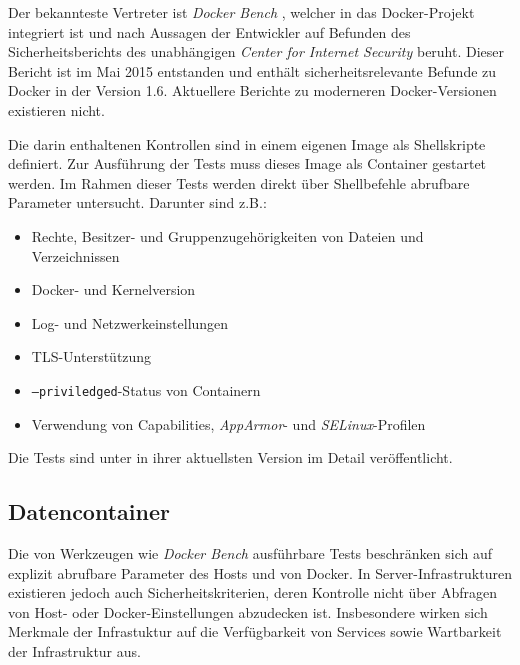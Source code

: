 \documentclass[../main.tex]{subfiles}
\begin{document}
    Der bekannteste Vertreter ist \emph{Docker Bench} \cite{githubDockerBench}, welcher in das Docker-Projekt integriert ist und nach Aussagen der Entwickler auf Befunden des Sicherheitsberichts des unabhängigen \emph{Center for Internet Security} \cite{dockerBenchmarkCIS} beruht. Dieser Bericht ist im Mai 2015 entstanden und enthält sicherheitsrelevante Befunde zu Docker in der Version 1.6. Aktuellere Berichte zu moderneren Docker-Versionen existieren nicht.

    Die darin enthaltenen Kontrollen sind in einem eigenen Image als Shellskripte definiert. Zur Ausführung der Tests muss dieses Image als Container gestartet werden. Im Rahmen dieser Tests werden direkt über Shellbefehle abrufbare Parameter untersucht. Darunter sind z.B.:

    \begin{itemize}
      \item Rechte, Besitzer- und Gruppenzugehörigkeiten von Dateien und Verzeichnissen
      \item Docker- und Kernelversion
      \item Log- und Netzwerkeinstellungen
      \item TLS-Unterstützung
      \item \texttt{--priviledged}-Status von Containern
      \item Verwendung von Capabilities, \emph{AppArmor}- und \emph{SELinux}-Profilen
    \end{itemize}

    Die Tests sind unter \cite{githubDockerBenchTests} in ihrer aktuellsten Version im Detail veröffentlicht.

    \subsection{Datencontainer}
      Die von Werkzeugen wie \emph{Docker Bench} ausführbare Tests beschränken sich auf explizit abrufbare Parameter des Hosts und von Docker. In Server-Infrastrukturen existieren jedoch auch Sicherheitskriterien, deren Kontrolle nicht über Abfragen von Host- oder Docker-Einstellungen abzudecken ist. Insbesondere wirken sich Merkmale der Infrastuktur auf die Verfügbarkeit von Services sowie Wartbarkeit der Infrastruktur aus.
\end{document}
